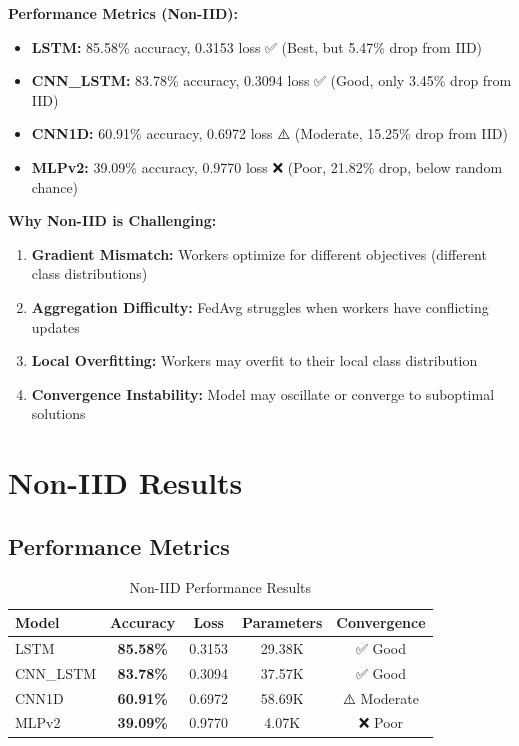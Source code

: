 \documentclass[12pt,a4paper]{article}
\begin{document}
\textbf{Performance Metrics (Non-IID):}
\begin{itemize}
    \item \textbf{LSTM:} 85.58\% accuracy, 0.3153 loss ✅ (Best, but 5.47\% drop from IID)
    \item \textbf{CNN\_LSTM:} 83.78\% accuracy, 0.3094 loss ✅ (Good, only 3.45\% drop from IID)
    \item \textbf{CNN1D:} 60.91\% accuracy, 0.6972 loss ⚠️ (Moderate, 15.25\% drop from IID)
    \item \textbf{MLPv2:} 39.09\% accuracy, 0.9770 loss ❌ (Poor, 21.82\% drop, below random chance)
\end{itemize}

\textbf{Why Non-IID is Challenging:}
\begin{enumerate}
    \item \textbf{Gradient Mismatch:} Workers optimize for different objectives (different class distributions)
    \item \textbf{Aggregation Difficulty:} FedAvg struggles when workers have conflicting updates
    \item \textbf{Local Overfitting:} Workers may overfit to their local class distribution
    \item \textbf{Convergence Instability:} Model may oscillate or converge to suboptimal solutions
\end{enumerate}

\section{Non-IID Results}

\subsection{Performance Metrics}

\begin{table}[h]
\centering
\begin{tabular}{@{}lcccc@{}}
\toprule
\textbf{Model} & \textbf{Accuracy} & \textbf{Loss} & \textbf{Parameters} & \textbf{Convergence} \\
\midrule
LSTM & \textbf{85.58\%} & 0.3153 & 29.38K & ✅ Good \\
CNN\_LSTM & \textbf{83.78\%} & 0.3094 & 37.57K & ✅ Good \\
CNN1D & \textbf{60.91\%} & 0.6972 & 58.69K & ⚠️ Moderate \\
MLPv2 & \textbf{39.09\%} & 0.9770 & 4.07K & ❌ Poor \\
\bottomrule
\end{tabular}
\caption{Non-IID Performance Results}
\end{table}
\end{document}

